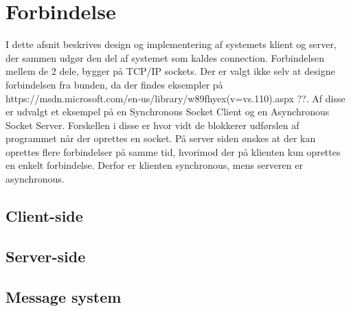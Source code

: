 \chapter{Forbindelse}
I dette afsnit beskrives design og implementering af systemets klient og server, der sammen udgør den del af systemet som kaldes connection. Forbindelsen mellem de 2 dele, bygger på TCP/IP sockets. Der er valgt ikke selv at designe forbindelsen fra bunden, da der findes eksempler på https://msdn.microsoft.com/en-us/library/w89fhyex(v=vs.110).aspx ??. Af disse er udvalgt et eksempel på en Synchronous Socket Client og en Asynchronous Socket Server. Forskellen i disse er hvor vidt de blokkerer udførslen af programmet når der oprettes en socket. På server siden ønskes at der kan oprettes flere forbindelser på samme tid, hvorimod der på klienten kun oprettes en enkelt forbindelse. Derfor er klienten synchronous, mens serveren er asynchronous.
\section{Client-side}

\section{Server-side}

\section{Message system}

%
%